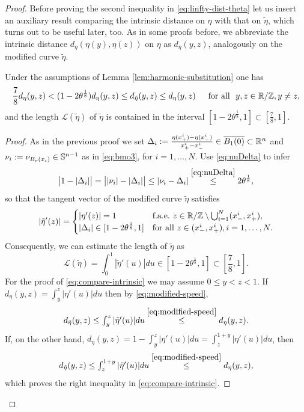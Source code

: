 \begin{proof}
Before proving the second inequality in \eqref{eq:linfty-dist-theta} let us insert
an auxiliary result comparing the intrinsic distance on $\eta$ with that on 
$\tilde{\eta}$, which turns out to be useful later, too. As in some
proofs before, we
abbreviate the intrinsic distance $d_\eta(\eta(y),\eta(z))$ on $\eta$ as 
$d_\eta(y,z)$, analogously on the modified curve $\tilde{\eta}$.
\begin{lemma}
\label{lem:compare-intrinsic}
Under the assumptions of Lemma \ref{lem:harmonic-substitution} one has
\begin{equation}\label{eq:compare-intrinsic}
\frac78 d_\eta(y,z)<(1-2\theta^\frac18)d_\eta(y,z)\le d_{\tilde{\eta}}(y,z)\le d_\eta(y,z)\quad\Foa
y,z\in\R/\Z, y\ne z,
\end{equation}
and the length $\mathscr{L}(\tilde{\eta})$ of $\tilde{\eta}$ is contained in the
interval $[1-2\theta^\frac18 , 1]\subset [\frac78,1]$.
\end{lemma}
\begin{proof}
As in the previous proof we set $\Delta_i:=\frac{\eta(x_+^i)-\eta(x_-^i)}{x_+^i-x_-^i}
\in\overline{B_1(0)}\subset\R^n$ and $\nu_i:=\nu_{B_r(x_i)}\in\S^{n-1}$ 
as in \eqref{eq:bmo3},
for $i=1,\ldots,N$. Use \eqref{eq:nuDelta} to infer
$$
\big|1-|\Delta_i|\big|=\big||\nu_i|-|\Delta_i|\big|\le |\nu_i-\Delta_i|\overset{
\eqref{eq:nuDelta}}{\le}2\theta^\frac18,
$$
so that the tangent vector of the modified curve $\tilde{\eta}$ satisfies
\begin{equation}\label{eq:modified-speed}
|\tilde{\eta}'(z)|=
\begin{cases}
|\eta'(z)| =1 & \textnormal{f.a.e.\@ $z\in\R/\Z\setminus\bigcup_{i=1}^N(x_-^i,x_+^i),$}\\
|\Delta_i|\in [1-2\theta^\frac18,1] & \textnormal{for all $z\in (x_-^i,x_+^i),i=1,\ldots,
N.$}
\end{cases}
\end{equation}
Consequently, we can estimate the length of $\tilde{\eta}$ as
\begin{equation}\label{eq:modified-length}
\mathscr{L}(\tilde{\eta})=\textstyle
\int_0 ^1|\tilde{\eta}'(u)|du\in [1-2\theta^\frac18,1]\subset [\frac78,1].
\end{equation}
For the proof of \eqref{eq:compare-intrinsic} we may assume $0\le y<z<1$.
If $d_\eta(y,z)=\int_y^z|\eta'(u)|du$ then by  \eqref{eq:modified-speed},
$$
d_{\tilde{\eta}}(y,z)\le\textstyle
\int_y^z|\tilde{\eta}'(u)|du\overset{\eqref{eq:modified-speed}}{\le} d_\eta(y,z).
$$
If, on the other hand, $d_\eta(y,z)=1-\int_y^z|\eta'(u)|du=\int_z^{1+y}|\eta'(u)|du$,
then 
$$
\textstyle
d_{\tilde{\eta}}(y,z)\le\int_z^{1+y}|\tilde{\eta}'(u)|du
\overset{\eqref{eq:modified-speed}}{\le}d_\eta(y,z),
$$ 
which proves the right
inequality in \eqref{eq:compare-intrinsic}.


\end{proof}
\end{proof}
